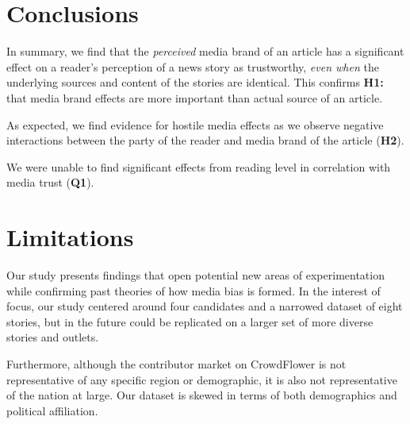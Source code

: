  

\section{Conclusions}
In summary, we find that the \emph{perceived} media brand of an article has a significant effect on a reader's perception of a news story as trustworthy, \emph{even when} the underlying sources and content of the stories are identical. This confirms \textbf{H1:} that media brand effects are more important than actual source of an article. 

As expected, we find evidence for hostile media effects as we observe negative interactions between the party of the reader and media brand of the article (\textbf{H2}).

We were unable to find significant effects from reading level in correlation with media trust (\textbf{Q1}).


\section{Limitations}

Our study presents findings that open potential new areas of experimentation while confirming past theories of how media bias is formed. In the interest of focus, our study centered around four candidates and a narrowed dataset of eight stories, but in the future could be replicated on a larger set of more diverse stories and outlets. 

Furthermore, although the contributor market on CrowdFlower is not representative of any specific region or demographic, it is also not representative of the nation at large. Our dataset is skewed in terms of both demographics and political affiliation.


